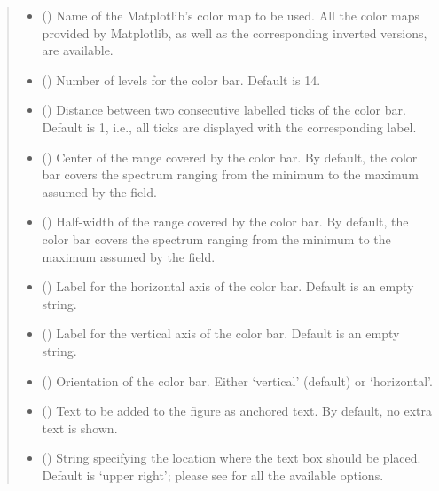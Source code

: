 \documentclass[letterpaper,10pt,english]{sphinxmanual}
\begin{document}
\begin{fulllineitems}
\begin{quote}
\begin{description}
\begin{itemize}
\item {} 
 () \textendash{} Name of the Matplotlib’s color map to be used. All the color maps provided by Matplotlib,
as well as the corresponding inverted versions, are available.

\item {} 
 () \textendash{} Number of levels for the color bar. Default is 14.

\item {} 
 () \textendash{} Distance between two consecutive labelled ticks of the color bar. Default is 1, i.e.,
all ticks are displayed with the corresponding label.

\item {} 
 () \textendash{} Center of the range covered by the color bar. By default, the color bar covers the spectrum
ranging from the minimum to the maximum assumed by the field.

\item {} 
 () \textendash{} Half-width of the range covered by the color bar. By default, the color bar covers the spectrum
ranging from the minimum to the maximum assumed by the field.

\item {} 
 () \textendash{} Label for the horizontal axis of the color bar. Default is an empty string.

\item {} 
 () \textendash{} Label for the vertical axis of the color bar. Default is an empty string.

\item {} 
 () \textendash{} Orientation of the color bar. Either ‘vertical’ (default) or ‘horizontal’.

\item {} 
 () \textendash{} Text to be added to the figure as anchored text. By default, no extra text is shown.

\item {} 
 () \textendash{} String specifying the location where the text box should be placed. Default is ‘upper right’;
please see  for all the available options.


\end{itemize}
\end{description}
\end{quote}
\end{fulllineitems}
\end{document}
